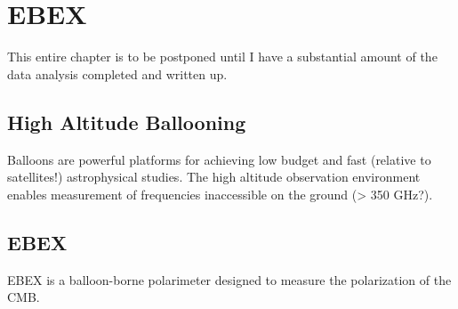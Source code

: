 \chapter{EBEX}
\label{ebex_chapter}

This entire chapter is to be postponed until I have a substantial amount of the data analysis completed and written up. 



\section{High Altitude Ballooning}
\label{ballooning_section}
Balloons are powerful platforms for achieving low budget and fast (relative to satellites!) astrophysical studies. The high altitude observation environment enables measurement of frequencies inaccessible on the ground (> 350 GHz?). 


\section{EBEX}
\label{ebex_section}
EBEX is a balloon-borne polarimeter designed to measure the polarization of the CMB. 

